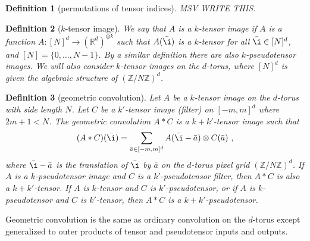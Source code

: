 \documentclass{article}
\theoremstyle{plain}
\newtheorem{definition}{Definition}
\begin{document}
\begin{definition}[permutations of tensor indices]
MSV WRITE THIS.
\end{definition}

\begin{definition}[$k$-tensor image]
We say that $A$ is a $k$-tensor image if $A$ is a function $A: [N]^d \to (\mathbb R^d)^{\otimes k}$ such that $A(\bar \i)$ is a $k$-tensor for all $\bar \i \in [N]^d$, and $[N]=\{0,\ldots, N-1\}$.
By a similar definition there are also $k$-pseudotensor images.
We will also consider $k$-tensor images on the $d$-torus, where $[N]^d$ is given the algebraic structure of $(\mathbb Z / N\mathbb Z)^d$.
\end{definition}

\begin{definition}[geometric convolution]
Let $A$ be a $k$-tensor image on the $d$-torus with side length $N$.
Let $C$ be a $k'$-tensor image (filter) on $[-m, m]^d$ where $2m+1<N$.
The geometric convolution $A\ast C$ is a $k+k'$-tensor image such that
\begin{equation}
    (A\ast C)(\bar\i) = \sum_{\bar a\in[-m, m]^d} A(\bar\i - \bar a)\otimes C(\bar a) ~,
\end{equation}
where $\bar\i - \bar a$ is the translation of $\bar\i$ by $\bar a$ on the $d$-torus pixel grid $(\mathbb Z / N\mathbb Z)^d$.
If $A$ is a $k$-pseudotensor image and $C$ is a $k'$-pseudotensor filter, then $A\ast C$ is also a $k+k'$-tensor.
If $A$ is $k$-tensor and $C$ is $k'$-pseudotensor, or if $A$ is $k$-pseudotensor and $C$ is $k'$-tensor, then $A\ast C$ is a $k+k'$-pseudotensor.
\end{definition}

Geometric convolution is the same as ordinary convolution on the $d$-torus except generalized to outer products of tensor and pseudotensor inputs and outputs.
\end{document}
